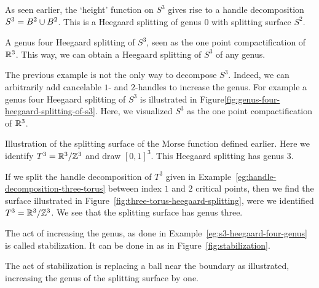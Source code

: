 \begin{eg}
    As seen earlier, the `height' function on $S^{3}$ gives rise to a handle decomposition $S^{3} = B^{2} \cup B^{2}$. This is a Heegaard splitting of genus $0$ with splitting surface $S^{2}$.
\end{eg}
\begin{eg}
    \begin{marginfigure}
        \centering
        \caption{A genus four Heegaard splitting of $S^{3}$, seen as the one point compactification of $\mathbb{R}^3$.
            This way, we can obtain a Heegaard splitting of $S^{3}$ of any genus.
        }
        \label{fig:genus-four-heegaard-splitting-of-s3}
    \end{marginfigure}
    The previous example is not the only way to decompose $S^{3}$.
    Indeed, we can arbitrarily add cancelable $1$- and $2$-handles to increase the genus. 
    For example a genus four Heegaard splitting of $S^{3}$ is illustrated in Figure\ref{fig:genus-four-heegaard-splitting-of-s3}.
    Here, we visualized $S^{3}$ as the one point compactification of $\mathbb{R}^3$.
    \label{eg:s3-heegaard-four-genus}
\end{eg}
\begin{marginfigure}
    \centering
    \caption{
        Illustration of the splitting surface of the Morse function defined earlier.
        Here we identify $T^{3} = \mathbb{R}^3 / \mathbb{Z}^3$ and draw $[0,1]^3$.
        This Heegaard splitting has genus $3$.
    }
    \label{fig:three-torus-heegaard-splitting}
\end{marginfigure}
\begin{eg}
    If we split the handle decomposition of $T^{3}$ given in Example~\ref{eg:handle-decomposition-three-torus} between index $1$ and $2$ critical points, then we find the surface illustrated in Figure~\ref{fig:three-torus-heegaard-splitting}, were we identified $T^{3} = \mathbb{R}^3 / \mathbb{Z}^{3}$.
    We see that the splitting surface has genus three.
\end{eg}


The act of increasing the genus, as done in Example~\ref{eg:s3-heegaard-four-genus} is called stabilization.
It can be done in as in Figure~\ref{fig:stabilization}.

\begin{marginfigure}
    \centering
    \caption{
        The act of stabilization is replacing a ball near the boundary as illustrated, increasing the genus of the splitting surface by one.}
    \label{fig:stabilization}
\end{marginfigure}

